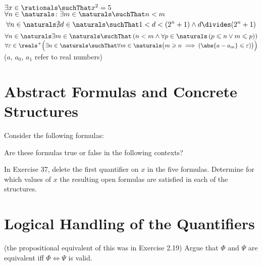 \documentclass{report}
\renewcommand{\leq}{\leqslant}
\renewcommand{\geq}{\geqslant}
\begin{document}
\begin{Exercise} [number=36]
  \Question $\exists{x} \in \rationals \suchThat x^2 = 5$
  \Question $\forall{n} \in \naturals \colon \exists{m} \in \naturals \suchThat n < m$
  \Question \[\forall{n} \in \naturals 
              \nexists{d} \in \naturals \suchThat 
                 1 < d < (2^n + 1) \land d \divides (2^n + 1)
            \]
  \Question $\forall{n} \in \naturals \exists{m} \in \naturals \suchThat \left( n < m \land \forall{p} \in \naturals \left(p \leq n \lor m \leq p \right)\right)$
  \Question $\forall{\varepsilon} \in \reals^{+} 
             \Bigl(
                \exists{n} \in \naturals \suchThat
                    \forall{m} \in \naturals
                    \bigl( 
                        m \geq n \implies 
                        \left(
                            \abs{a - a_m} \leq \varepsilon 
                        \right) 
                    \bigr) 
             \Bigr)$
            ($a$, $a_0$, $a_1$ refer to real numbers)
\end{Exercise}
  
\section{Abstract Formulas and Concrete Structures}

\begin{Exercise} [number=37]
Consider the following formulas:

Are these formulas true or false in the following contexts?
\end{Exercise}

\begin{Exercise} [number=38]
In Exercise 37, delete the first quantifier on $x$ in the five formulas. Determine for which values of $x$ the resulting open formulas are satisfied in each of the structures.
\end{Exercise}
\section{Logical Handling of the Quantifiers}

\begin{Exercise} [number=39]
    (the propositional equivalent of this was in Exercise 2.19)
    Argue that $\Phi$ and $\Psi$ are equivalent iff $\Phi \iff \Psi$ is valid.
\end{Exercise}
\end{document}
